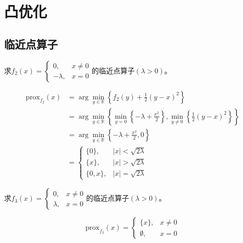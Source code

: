 \section{凸优化}
\subsection{临近点算子}
\begin{example}
    求$f_2(x)=\begin{cases}0,&x\neq0\\[2ex]-\lambda,&x=0\end{cases}$的临近点算子$(\lambda>0)$。
    \begin{solution}
        \[
            \begin{aligned}
                \mathrm{prox}_{f_{2}}(x)& =\arg\min_{y\in\mathbb{R}}\left\{f_{2}(y)+\frac{1}{2}(y-x)^{2}\right\}  \\
                &=\arg\min_{y\in\mathbb{R}}\left\{\min_{y=0}\left\{-\lambda+\frac{x^{2}}{2}\right\},\min_{y\neq0}\left\{\frac{1}{2}(y-x)^{2}\right\}\right\} \\
                &=\arg\min_{y\in\mathbb{R}}\left\{-\lambda+\frac{x^{2}}{2},0\right\} \\
                &\left.=\left\{\begin{array}{ll}\{0\},&|x|<\sqrt{2\lambda}\\[2ex]\{x\},&|x|>\sqrt{2\lambda}\\[2ex]\{0,x\},&|x|=\sqrt{2\lambda}\end{array}\right.\right.
            \end{aligned}
        \]    
    \end{solution}
\end{example}
\begin{example}
    求$f_3(x)=\begin{cases}0,&x\neq0\\[2ex]\lambda,&x=0\end{cases}$的临近点算子$(\lambda>0)$。

    \begin{solution}
        \[
            \mathrm{prox}_{f_3}(x)=
                \left\{
                    \begin{array}{cc}
                        \{x\}, & x\neq0\\
                        \emptyset, & x=0
                    \end{array}
                \right.
        \]
    \end{solution}
\end{example}
